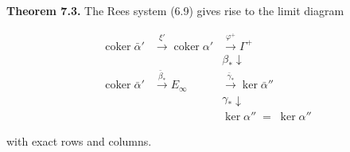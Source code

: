 \textbf{Theorem 7.3.} The Rees system (6.9) gives rise to the limit diagram

$$
\begin{array}{ccc}
\operatorname{coker} \bar{\alpha}' & \xrightarrow{\xi'} \operatorname{coker} \alpha' & \xrightarrow{\varphi^+} \Gamma^+ \\
& & {\scriptstyle \beta_*} \downarrow \\
\operatorname{coker} \bar{\alpha}' & \xrightarrow{\bar{\beta}_*} E_\infty & \xrightarrow{\bar{\gamma}_*} \ker \bar{\alpha}'' \\
& & {\scriptstyle \gamma_*} \downarrow \\
& & \ker \alpha'' \;=\; \ker \alpha''
\end{array}
$$

with exact rows and columns.
